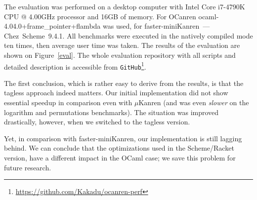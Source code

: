 The evaluation was performed on a desktop computer with Intel Core i7-4790K CPU @ 4.00GHz processor and 16GB of memory.
For OCanren \mbox{ocaml-4.04.0+frame_pointer+flambda} was used, for faster-miniKanren~--- Chez~Scheme~9.4.1.
All benchmarks were executed in the natively compiled mode ten times, then average user time was taken. The results of the evaluation
are shown on Figure~\ref{eval}. The whole evaluation repository with all scripts and detailed description is accessible
from \lstinline{GitHub}\footnote{\url{https://github.com/Kakadu/ocanren-perf}}.

The first conclusion, which is rather easy to derive from the results, is that the tagless approach indeed matters. Our initial
implementation did not show essential speedup in comparison even with $\mu$Kanren (and was even \emph{slower} on the logarithm
and permutations benchmarks). The situation was improved drastically, however, when we switched to the tagless version.

Yet, in comparison with faster-miniKanren, our implementation is still lagging behind. We can conclude that the optimizations
used in the Scheme/Racket version, have a different impact in the OCaml case; we save this problem for future research.

